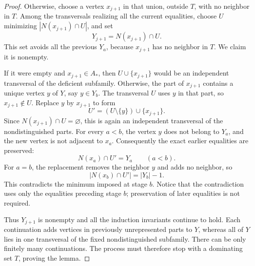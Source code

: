 \begin{proof}
Otherwise, choose a vertex $x_{j+1}$ in that union, outside $T$, with
no neighbor in $T$.  Among the transversals realizing all the current
equalities, choose $U$ minimizing $|N(x_{j+1})\cap U|$, and set
\[
 Y_{j+1}=N(x_{j+1})\cap U.
\]
This set avoids all the previous $Y_a$, because $x_{j+1}$ has no
neighbor in $T$.  We claim it is nonempty.

If it were empty and $x_{j+1}\in A_*$, then $U\cup\{x_{j+1}\}$
would be an independent transversal of the deficient subfamily.
Otherwise, the part of $x_{j+1}$ contains a unique vertex $y$ of $Y$,
say $y\in Y_b$.  The transversal $U$ uses $y$ in that part, so
$x_{j+1}\notin U$.  Replace $y$ by $x_{j+1}$ to form
\[
 U'=(U\setminus\{y\})\cup\{x_{j+1}\}.
\]
Since $N(x_{j+1})\cap U=\varnothing$, this is again an independent
transversal of the nondistinguished parts.  For every $a<b$, the vertex
$y$ does not belong to $Y_a$, and the new vertex is not adjacent to
$x_a$.  Consequently the exact earlier equalities are preserved:
\[
 N(x_a)\cap U'=Y_a\qquad(a<b).
\]
For $a=b$, the replacement removes the neighbor $y$ and adds no neighbor,
so
\[
 |N(x_b)\cap U'|=|Y_b|-1.
\]
This contradicts the minimum imposed at stage $b$.  Notice that the
contradiction uses only the equalities preceding stage $b$; preservation
of later equalities is not required.

Thus $Y_{j+1}$ is nonempty and all the induction invariants continue to
hold.  Each continuation adds vertices in previously unrepresented
parts to $Y$, whereas all of $Y$ lies in one transversal of the fixed
nondistinguished subfamily.  There can be only finitely many
continuations.  The process must therefore stop with a dominating set
$T$, proving the lemma.
\end{proof}

